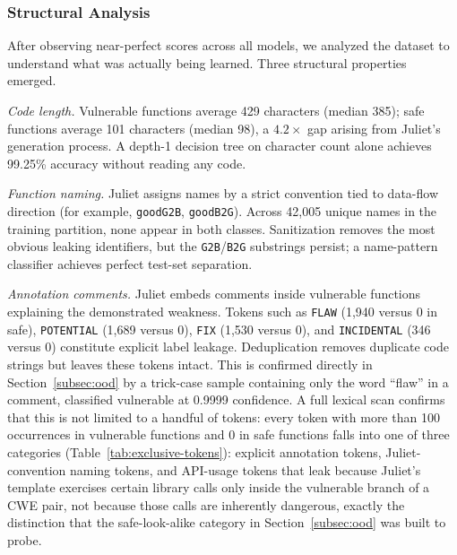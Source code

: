 \documentclass{ieeeaccess}
\begin{document}
\subsubsection{Structural Analysis}
\label{par:structural}
After observing near-perfect scores across all models, we analyzed the dataset to understand what was actually being learned. Three structural properties emerged.

\textit{Code length.} Vulnerable functions average 429 characters (median 385); safe functions average 101 characters (median 98), a $4.2\times$ gap arising from Juliet's generation process. A depth-1 decision tree on character count alone achieves 99.25\% accuracy without reading any code.

\textit{Function naming.} Juliet assigns names by a strict convention tied to data-flow direction (for example, \texttt{goodG2B}, \texttt{goodB2G}). Across 42{,}005 unique names in the training partition, none appear in both classes. Sanitization removes the most obvious leaking identifiers, but the \texttt{G2B}/\texttt{B2G} substrings persist; a name-pattern classifier achieves perfect test-set separation.

\textit{Annotation comments.} Juliet embeds comments inside vulnerable functions explaining the demonstrated weakness. Tokens such as \texttt{FLAW} (1{,}940 versus 0 in safe), \texttt{POTENTIAL} (1{,}689 versus 0), \texttt{FIX} (1{,}530 versus 0), and \texttt{INCIDENTAL} (346 versus 0) constitute explicit label leakage. Deduplication removes duplicate code strings but leaves these tokens intact. This is confirmed directly in Section~\ref{subsec:ood} by a trick-case sample containing only the word ``flaw'' in a comment, classified vulnerable at 0.9999 confidence. A full lexical scan confirms that this is not limited to a handful of tokens: every token with more than 100 occurrences in vulnerable functions and 0 in safe functions falls into one of three categories (Table~\ref{tab:exclusive-tokens}): explicit annotation tokens, Juliet-convention naming tokens, and API-usage tokens that leak because Juliet's template exercises certain library calls only inside the vulnerable branch of a CWE pair, not because those calls are inherently dangerous, exactly the distinction that the safe-look-alike category in Section~\ref{subsec:ood} was built to probe.
\end{document}
